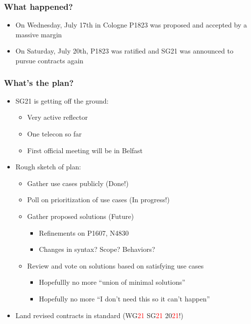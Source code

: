 \begin{frame}
  \frametitle{What happened?}
  \begin{itemize}
  \item On Wednesday, July 17th in Cologne P1823 was proposed and accepted by a massive margin \pause
  \item On Saturday, July 20th, P1823 was ratified and SG21 was announced to pursue contracts again
  \end{itemize}
\end{frame}
  

\begin{frame}
  \frametitle{What's the plan?}
  \begin{itemize}
  \item SG21 is getting off the ground: \pause
    \begin{itemize}
    \item Very active reflector \pause
    \item One telecon so far \pause
    \item First official meeting will be in Belfast \pause
    \end{itemize}
  \item Rough sketch of plan: \pause
    \begin{itemize}
    \item Gather use cases publicly \pause (Done!)\pause
    \item Poll on prioritization of use cases \pause (In progress!) \pause
    \item Gather proposed solutions (Future) \pause
      \begin{itemize}
      \item Refinements on P1607, N4830 \pause
      \item Changes in syntax?  Scope?  Behaviors?  \pause
      \end{itemize}
    \item Review and vote on solutions based on satisfying use cases
      \begin{itemize}
      \item Hopefullly no more ``union of minimal solutions'' \pause
      \item Hopefully no more ``I don't need this so it can't happen'' \pause
      \end{itemize}
    \end{itemize}
    \item Land revised contracts in standard \pause (WG\textcolor{red}{21} SG\textcolor{red}{21} 20\textcolor{red}{21}!) 
  \end{itemize}
  
\end{frame}

